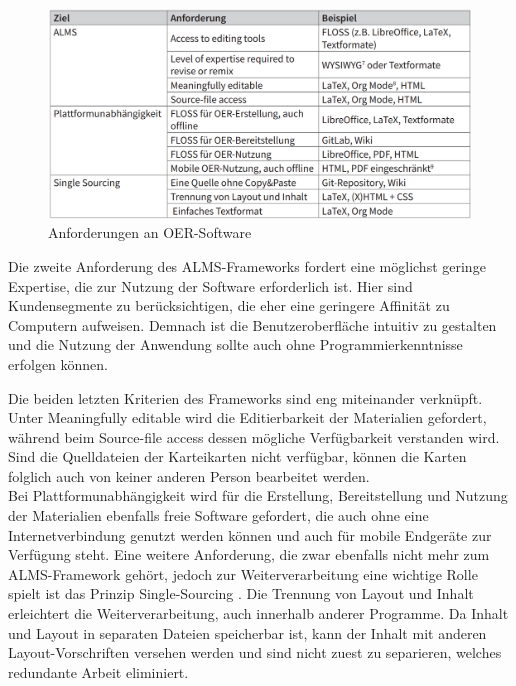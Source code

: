 \begin{figure}[h]
\begin{center}
\includegraphics[width = 16cm]{alms_framework.png}
\caption{Anforderungen an OER-Software \cite{Lechtenborger.2019}}
\label{Anforderungen an OER-Software}

\end{center}
\end{figure}


Die zweite Anforderung des ALMS-Frameworks fordert eine möglichst geringe Expertise, die zur Nutzung der Software erforderlich ist. Hier sind Kundensegmente zu berücksichtigen, die eher eine geringere Affinität zu Computern aufweisen. Demnach ist die Benutzeroberfläche intuitiv zu gestalten und die Nutzung der Anwendung sollte auch ohne Programmierkenntnisse erfolgen können.

Die beiden letzten Kriterien des Frameworks sind eng miteinander verknüpft. Unter \glqq Meaningfully editable \grqq{} wird die Editierbarkeit der Materialien gefordert, während beim \glqq Source-file access \grqq{} dessen mögliche Verfügbarkeit verstanden wird. Sind die Quelldateien der Karteikarten nicht verfügbar, können die Karten folglich auch von keiner anderen Person bearbeitet werden. \\

Bei Plattformunabhängigkeit wird für die Erstellung, Bereitstellung und Nutzung der Materialien ebenfalls freie Software gefordert, die auch ohne eine Internetverbindung genutzt werden können und auch für mobile Endgeräte zur Verfügung steht. Eine weitere Anforderung, die zwar ebenfalls nicht mehr zum ALMS-Framework gehört, jedoch zur Weiterverarbeitung eine wichtige Rolle spielt ist das Prinzip \glqq Single-Sourcing \grqq{}. Die Trennung von Layout und Inhalt erleichtert die Weiterverarbeitung, auch innerhalb anderer Programme. Da Inhalt und Layout in separaten Dateien speicherbar ist, kann der Inhalt mit anderen Layout-Vorschriften versehen werden und sind nicht zuest zu separieren, welches redundante Arbeit eliminiert.  \\

